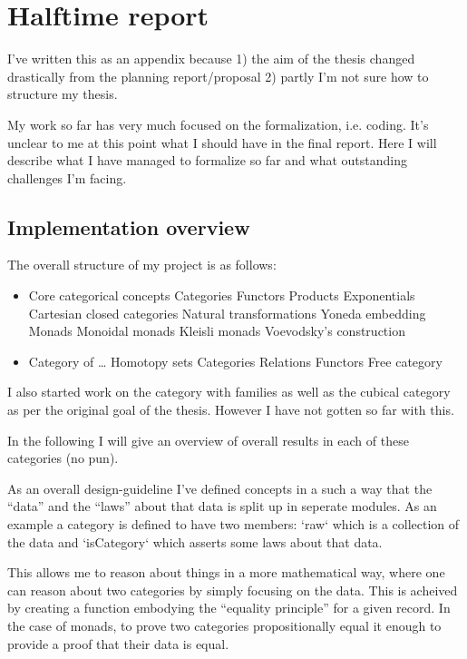 \section{Halftime report}
I've written this as an appendix because 1) the aim of the thesis changed
drastically from the planning report/proposal 2) partly I'm not sure how to
structure my thesis.

My work so far has very much focused on the formalization, i.e. coding. It's
unclear to me at this point what I should have in the final report. Here I will
describe what I have managed to formalize so far and what outstanding challenges
I'm facing.

\subsection{Implementation overview}
The overall structure of my project is as follows:

\begin{itemize}
\item Core categorical concepts
\subitem Categories
\subitem Functors
\subitem Products
\subitem Exponentials
\subitem Cartesian closed categories
\subitem Natural transformations
\subitem Yoneda embedding
\subitem Monads
\subsubitem Monoidal monads
\subsubitem Kleisli monads
\subsubitem Voevodsky's construction
\item Category of \ldots
\subitem Homotopy sets
\subitem Categories
\subitem Relations
\subitem Functors
\subitem Free category
\end{itemize}

I also started work on the category with families as well as the cubical
category as per the original goal of the thesis. However I have not gotten so
far with this.

In the following I will give an overview of overall results in each of these
categories (no pun).

As an overall design-guideline I've defined concepts in a such a way that the
``data'' and the ``laws'' about that data is split up in seperate modules. As an
example a category is defined to have two members: `raw` which is a collection
of the data and `isCategory` which asserts some laws about that data.

This allows me to reason about things in a more mathematical way, where one can
reason about two categories by simply focusing on the data. This is acheived by
creating a function embodying the ``equality principle'' for a given record. In
the case of monads, to prove two categories propositionally equal it enough to
provide a proof that their data is equal.


